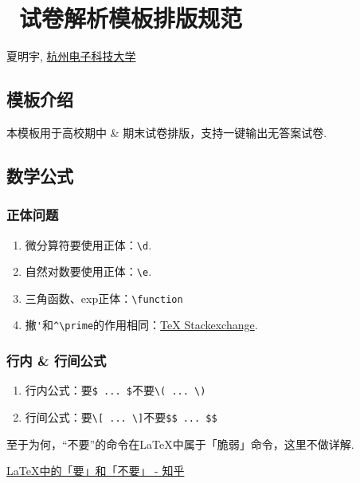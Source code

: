\chapter*{~试卷解析模板排版规范}%


\centerline{夏明宇, \href{https://www.hdu.edu.cn}{杭州电子科技大学}}
\yyyymmdddate
\centerline{}

\section{模板介绍}
本模板用于高校期中 \& 期末试卷排版，支持一键输出无答案试卷.

\section{数学公式}
\subsection{正体问题}
\begin{enumerate}
	\item 微分算符要使用正体：\verb|\d|.
	\item 自然对数要使用正体：\verb|\e|.
	\item 三角函数、exp正体：\verb|\function|
	\item 撇\verb|'|和\verb|^\prime|的作用相同：\href{https://tex.stackexchange.com/a/538413/299948}{TeX Stackexchange}.
\end{enumerate}

\subsection{行内 \& 行间公式}
\begin{enumerate}
	\item 行内公式：要\verb|$ ... $|不要\verb|\( ... \)|
	\item 行间公式：要\verb|\[ ... \]|不要\verb|$$ ... $$|
\end{enumerate}
至于为何，“不要”的命令在\LaTeX 中属于「脆弱」命令，这里不做详解.

\href{https://www.zhihu.com/question/27589739}{\LaTeX 中的「要」和「不要」 - 知乎}

